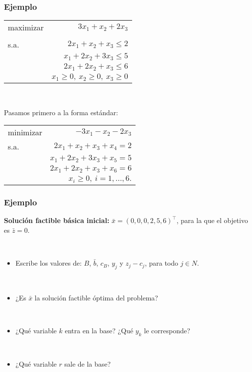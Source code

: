 \documentclass{beamer}
\begin{document}
\begin{frame}
\frametitle{Ejemplo}

\begin{center}
\begin{tabular}{lr}
maximizar & $3x_1 + x_2 + 2x_3$ \\
	 &  \\
s.a. & $2x_1+x_2+x_3 \leq 2$    \\
	 & $x_1 + 2x_2 + 3x_3\leq 5$  \\
	 & $2x_1+2x_2+x_3\leq 6$ \\
	 & $x_1\geq 0,\ x_2\geq 0,\ x_3\geq 0$
\end{tabular}
\end{center}

\

Pasamos primero a la forma estándar:

\begin{center}
\begin{tabular}{lr}
minimizar & $-3x_1 - x_2 - 2x_3$ \\
s.a. & $2x_1+x_2+x_3 + x_4 = 2$    \\
	 & $x_1 + 2x_2 + 3x_3 +  x_5 = 5$  \\
	 & $2x_1+2x_2+x_3 + x_6 = 6$ \\
	 & $x_i\geq 0,\ i=1,\ldots,6.$
\end{tabular}
\end{center}


\end{frame}
\begin{frame}
\frametitle{Ejemplo}

\textbf{Solución factible básica inicial:} $\bar{x}=(0,0,0,2,5,6)^\top$, para la que el objetivo es $\bar{z}=0$.

\
\

\begin{itemize}

\item Escribe los valores de: $B$, $\bar{b}$, $c_B$, $y_j$ y $z_j-c_j$, para todo $j\in N$.

\

\item ¿Es $\bar{x}$ la solución factible óptima del problema?

\

\item ¿Qué variable $k$ entra en la base? ¿Qué $y_k$ le corresponde?

\

\item ¿Qué variable $r$ sale de la base?

\

\end{itemize}


\end{frame}
\end{document}

